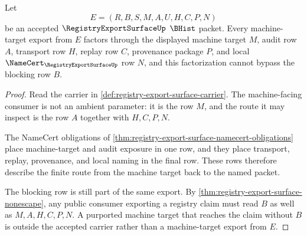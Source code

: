 \begin{theorem}
\label{thm:registry-export-surface-machine-target-audit-route}
Let
$$
E=(R,B,S,M,A,U,H,C,P,N)
$$
be an accepted $\RegistryExportSurfaceUp$ $\BHist$ packet. Every machine-target export from $E$ factors through the displayed machine target $M$, audit row $A$, transport row $H$, replay row $C$, provenance package $P$, and local $\NameCert_{\RegistryExportSurfaceUp}$ row $N$, and this factorization cannot bypass the blocking row $B$.
\end{theorem}
\begin{proof}
Read the carrier in \autoref{def:registry-export-surface-carrier}. The machine-facing consumer is not an ambient parameter: it is the row $M$, and the route it may inspect is the row $A$ together with $H,C,P,N$.

The NameCert obligations of \autoref{thm:registry-export-surface-namecert-obligations} place machine-target and audit exposure in one row, and they place transport, replay, provenance, and local naming in the final row. These rows therefore describe the finite route from the machine target back to the named packet.

The blocking row is still part of the same export. By \autoref{thm:registry-export-surface-nonescape}, any public consumer exporting a registry claim must read $B$ as well as $M,A,H,C,P,N$. A purported machine target that reaches the claim without $B$ is outside the accepted carrier rather than a machine-target export from $E$.
\end{proof}

